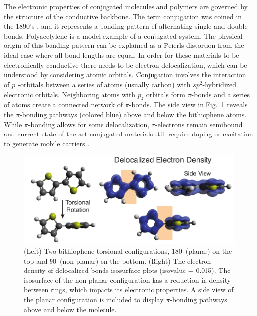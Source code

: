 The electronic properties of conjugated molecules and polymers are governed by the structure of the conductive backbone. The term conjugation was coined in the 1890’s \cite{Thiele1899}, and it represents a bonding pattern of alternating single and double bonds. Polyacetylene is a model example of a conjugated system. The physical origin of this bonding pattern can be explained as a Peierls distortion \cite{Roth2013} from the ideal case where all bond lengths are equal. In order for these materials to be electronically conductive there needs to be electron delocalization, which can be understood by considering atomic orbitals. Conjugation involves the interaction of $p_z$-orbitals between a series of atoms (usually carbon) with $sp^2$-hybridized electronic orbitals. Neighboring atoms with $p_z$ orbitals form $\pi$-bonds and a series of atoms create a connected network of $\pi$-bonds. The side view in Fig.~\ref{fig:eddb} reveals the $\pi$-bonding pathways (colored blue) above and below the bithiophene atoms. While $\pi$-bonding allows for some delocalization, $\pi$-electrons remain semibound and current state-of-the-art conjugated materials still require doping or excitation to generate mobile carriers \cite{Nobel2000}.

\begin{figure}[hbt!]
  \includegraphics{figures/chap1_intro/figure_delocal_copy.pdf}
  \caption{(Left) Two bithiophene torsional configurations, 180\textdegree \  (planar) on the top and 90\textdegree \ (non-planar) on the bottom. (Right) The electron density of delocalized bonds \cite{Szczepanik2017} isosurface plots (isovalue = 0.015). The isosurface of the non-planar configuration has a reduction in density between rings, which impacts its electronic properties. A side view of the planar configuration is included to display $\pi$-bonding pathways above and below the molecule.}
  \label{fig:eddb}
\end{figure}

